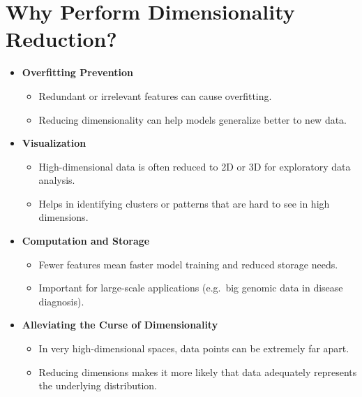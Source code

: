 \documentclass[10pt]{article}
\begin{document}
\section{Why Perform Dimensionality Reduction?}
\begin{itemize}
    \item \textbf{Overfitting Prevention}
    \begin{itemize}
        \item Redundant or irrelevant features can cause overfitting.
        \item Reducing dimensionality can help models generalize better to new data.
    \end{itemize}
    \item \textbf{Visualization}
    \begin{itemize}
        \item High-dimensional data is often reduced to 2D or 3D for exploratory data analysis.
        \item Helps in identifying clusters or patterns that are hard to see in high dimensions.
    \end{itemize}
    \item \textbf{Computation and Storage}
    \begin{itemize}
        \item Fewer features mean faster model training and reduced storage needs.
        \item Important for large-scale applications (e.g.\ big genomic data in disease diagnosis).
    \end{itemize}
    \item \textbf{Alleviating the Curse of Dimensionality}
    \begin{itemize}
        \item In very high-dimensional spaces, data points can be extremely far apart.
        \item Reducing dimensions makes it more likely that data adequately represents the underlying distribution.
    \end{itemize}
\end{itemize}
\end{document}
